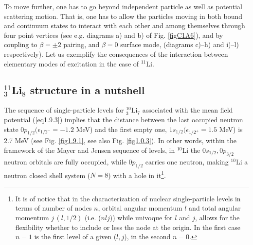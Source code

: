 To move further, one has to go beyond independent particle as well as  potential scattering motion. That is, one has  to allow the particles moving in both bound and continuum states to interact with each other and among themselves through four point vertices (see e.g.  diagrams a) and b) of Fig. \ref{figC1A6}), and by coupling to $\beta=\pm2$ pairing, and $\beta=0$ surface mode, (diagrams c)--h) and i)--l) respectively). 
Let us exemplify the consequences of the interaction between  elementary modes of excitation in the case of $^{11}$Li.
\subsection{$^{11}_3$Li$_8$ structure in a nutshell}\label{S1.9.3}
The sequence of single-particle levels for  $^{10}_3$Li$_7$ associated with the mean field potential (\ref{eq1.9.3}) implies that the distance between the last occupied neutron state $0p_{1/2}(\epsilon_{1/2^-}=-1.2$ MeV) and  the first empty one, $1s_{1/2}(\epsilon_{1/2^+}=1.5$ MeV) is 2.7 MeV (see Fig. \ref{fig1.9.1}, see also Fig. \ref{fig1.0.3}). In other words, within the framework of the Mayer and Jensen sequence of levels, in $^{10}$Li the $0s_{1/2},0p_{3/2}$ neutron orbitals are fully occupied, while $0p_{1/2}$ carries one neutron, making $^{10}$Li a neutron closed shell system ($N=8$) with a hole in it\footnote{It is of notice that in the characterization of nuclear single-particle levels in terms of number of nodes $n$, orbital angular momentum $l$ and total angular momentum $j\,(l,1/2)$ (i.e. ($nlj$)) while univoque for $l$ and $j$, allows for the flexibility whether to include or less the node at the origin. In the first case $n=1$ is the first level of a given ($l,j$), in the second $n=0$.}.
